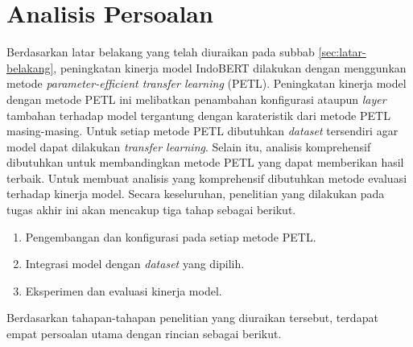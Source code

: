 \section{Analisis Persoalan}
\label{sec:analisis-persoalan}

Berdasarkan latar belakang yang telah diuraikan pada subbab \ref{sec:latar-belakang}, peningkatan kinerja model IndoBERT dilakukan dengan menggunkan metode \textit{parameter-efficient transfer learning} (PETL). Peningkatan kinerja model dengan metode PETL ini melibatkan penambahan konfigurasi ataupun \textit{layer} tambahan terhadap model tergantung dengan karateristik dari metode PETL masing-masing. Untuk setiap metode PETL dibutuhkan \textit{dataset} tersendiri agar model dapat dilakukan \textit{transfer learning}. Selain itu, analisis komprehensif dibutuhkan untuk membandingkan metode PETL yang dapat memberikan hasil terbaik. Untuk membuat analisis yang komprehensif dibutuhkan metode evaluasi terhadap kinerja model. Secara keseluruhan, penelitian yang dilakukan pada tugas akhir ini akan mencakup tiga tahap sebagai berikut.

\begin{enumerate}
    \item Pengembangan dan konfigurasi pada setiap metode PETL.
    \item Integrasi model dengan \textit{dataset} yang dipilih.
    \item Eksperimen dan evaluasi kinerja model.
\end{enumerate}

Berdasarkan tahapan-tahapan penelitian yang diuraikan tersebut, terdapat empat persoalan utama dengan rincian sebagai berikut.

